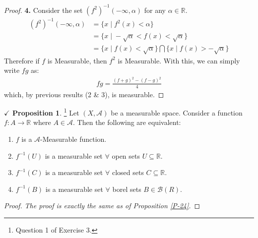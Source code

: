 \documentclass{article}
\theoremstyle{definition}
\theoremstyle{remark}
\theoremstyle{definition}
\theoremstyle{definition}
\newtheorem{proposition}{$\checkmark$ Proposition}
\theoremstyle{definition}
\newcommand{\bintrs}{\bigcap}
\newcommand{\where}{\;\vert\;}
\newcommand{\R}{\mathbb{R}}
\newcommand{\alg}[1]{\mathscr{#1}}
\newcommand{\bor}[1]{\mathscr{B}(#1)}
\newcommand{\inv}[1]{{#1}^{-1}}
\begin{document}
\begin{proof}
\textbf{4.} Consider the set $ \inv{(f^{2})}(-\infty,\alpha) $ for any $ \alpha \in \R $. 
\begin{equation*}
	\begin{split}
		\inv{(f^{2})}(-\infty,\alpha) &= \{x\where f^2(x) < \alpha\}\\
		&= \{x\where -\sqrt{\alpha} < f(x) < \sqrt{\alpha}\}\\
		&= \{x\where f(x) < \sqrt{\alpha}\} \bintrs \{x\where f(x) > -\sqrt{\alpha}\}
	\end{split}
\end{equation*}
Therefore if $ f $ is Measurable, then $ f^{2} $ is Measurable. With this, we can simply write $ fg $ as:
\begin{equation*}
	\begin{split}
		fg = \frac{(f+g)^{2} - (f-g)^{2} }{4}
	\end{split}
\end{equation*}
which, by previous results (2 \& 3), is measurable. 
\end{proof}
\hrulefill
\begin{proposition}\footnote{Question 1 of Exercise 3.}
Let $ (X,\alg{A}) $ be a measurable space. Consider a function $ f : A\to \R $ where $ A\in \alg{A} $. Then the following are equivalent:
\begin{enumerate}
	\item {$ f $ is a $ \alg{A} $-Measurable function.}
	\item {$ \inv{f}(U) $ is a measurable set $ \forall $ open sets $ U \subseteq \R $.}
	\item {$ \inv{f}(C) $ is a measurable set $ \forall $ closed sets $ C \subseteq \R $.}
	\item {$ \inv{f}(B) $ is a measurable set $ \forall $ borel sets $ B \in \bor{R} $.}
\end{enumerate}	
\end{proposition}
\begin{proof}
	\emph{The proof is exactly the same as of Proposition \ref{P-24}.}
\end{proof}
\end{document}
